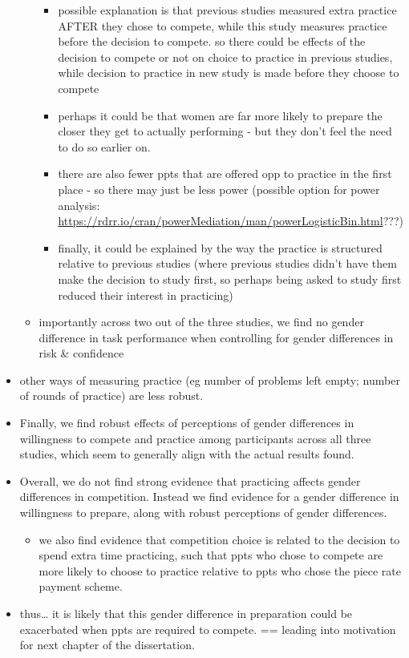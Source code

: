 \documentclass[a4paper, nobind]{templates/ociamthesis}
\providecommand{\tightlist}{%
  \setlength{\itemsep}{0pt}\setlength{\parskip}{0pt}}
\begin{document}
\begin{itemize}
\begin{itemize}
    \begin{itemize}
    \tightlist
    \item
      possible explanation is that previous studies measured extra practice AFTER they chose to compete, while this study measures practice before the decision to compete. so there could be effects of the decision to compete or not on choice to practice in previous studies, while decision to practice in new study is made before they choose to compete
    \item
      perhaps it could be that women are far more likely to prepare the closer they get to actually performing - but they don't feel the need to do so earlier on.
    \item
      there are also fewer ppts that are offered opp to practice in the first place - so there may just be less power (possible option for power analysis: \url{https://rdrr.io/cran/powerMediation/man/powerLogisticBin.html}???)
    \item
      finally, it could be explained by the way the practice is structured relative to previous studies (where previous studies didn't have them make the decision to study first, so perhaps being asked to study first reduced their interest in practicing)
    \end{itemize}
  \item
    importantly across two out of the three studies, we find no gender difference in task performance when controlling for gender differences in risk \& confidence
  \end{itemize}
\item
  other ways of measuring practice (eg number of problems left empty; number of rounds of practice) are less robust.
\item
  Finally, we find robust effects of perceptions of gender differences in willingness to compete and practice among participants across all three studies, which seem to generally align with the actual results found.
\item
  Overall, we do not find strong evidence that practicing affects gender differences in competition. Instead we find evidence for a gender difference in willingness to prepare, along with robust perceptions of gender differences.

  \begin{itemize}
  \tightlist
  \item
    we also find evidence that competition choice is related to the decision to spend extra time practicing, such that ppts who chose to compete are more likely to choose to practice relative to ppts who chose the piece rate payment scheme.
  \end{itemize}
\item
  thus\ldots{} it is likely that this gender difference in preparation could be exacerbated when ppts are required to compete. == leading into motivation for next chapter of the dissertation.
\end{itemize}
\end{document}
